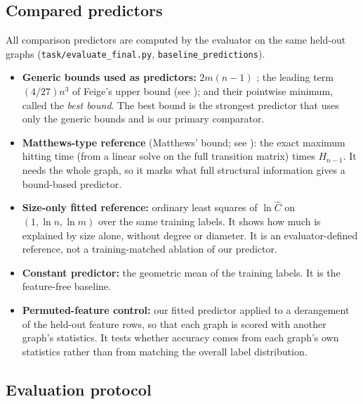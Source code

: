 \documentclass{article}
\newcommand{\Ccov}{C}
\begin{document}
\subsection{Compared predictors}
\label{sec:compared}
All comparison predictors are computed by the evaluator on the same held-out graphs (\texttt{task/evaluate\_final.py}, \texttt{baseline\_predictions}).
\begin{itemize}
\item \textbf{Generic bounds used as predictors:} $2m(n-1)$ \citep{Aleliunas1979RandomWU}; the leading term $(4/27)n^3$ of Feige's upper bound (see \citealp{Lovász2001RandomWO}); and their pointwise minimum, called the \emph{best bound}. The best bound is the strongest predictor that uses only the generic bounds and is our primary comparator.
\item \textbf{Matthews-type reference} (Matthews' bound; see \citealp{Lovász2001RandomWO}): the exact maximum hitting time (from a linear solve on the full transition matrix) times $H_{n-1}$. It needs the whole graph, so it marks what full structural information gives a bound-based predictor.
\item \textbf{Size-only fitted reference:} ordinary least squares of $\ln\hat\Ccov$ on $(1,\ln n,\ln m)$ over the same training labels. It shows how much is explained by size alone, without degree or diameter. It is an evaluator-defined reference, not a training-matched ablation of our predictor.
\item \textbf{Constant predictor:} the geometric mean of the training labels. It is the feature-free baseline.
\item \textbf{Permuted-feature control:} our fitted predictor applied to a derangement of the held-out feature rows, so that each graph is scored with another graph's statistics. It tests whether accuracy comes from each graph's own statistics rather than from matching the overall label distribution.
\end{itemize}

\subsection{Evaluation protocol}
\label{sec:protocol}
\end{document}
